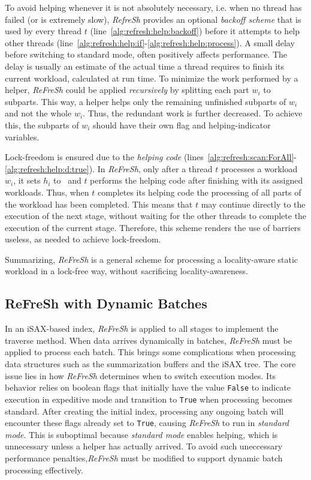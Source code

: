 To avoid helping whenever it is not absolutely necessary, i.e. when no thread has
failed (or is extremely slow), \textit{RefreSh} provides an optional {\em backoff scheme} that is used
by every thread $t$ (line~\ref{alg:refresh:help:backoff}) 
before it attempts to help other threads (line~\ref{alg:refresh:help:if}-\ref{alg:refresh:help:process}).
A small delay before switching to standard mode, often positively affects performance.
The delay is usually an estimate of the actual time a thread requires to finish its
current workload, calculated at run time.
% 
To minimize the work performed by a helper, \textit{ReFreSh} could
be applied  {\em recursively} by splitting each part $w_i$ to subparts. 
This way, a helper helps only the remaining unfinished subparts of $w_i$
and not the whole $w_i$. Thus, the redundant work is further decreased. 
To achieve this, the subparts of $w_i$ should have their own flag and helping-indicator variables.

Lock-freedom is ensured due to the {\em helping code} (lines~\ref{alg:refresh:scan:ForAll}-
\ref{alg:refresh:help:d:true}). In \textit{ReFreSh}, only after a thread
$t$ processes a workload $w_i$, it sets $h_i$ to \True\, and $t$ performs 
the helping code after finishing with its assigned workloads. Thus, when $t$ completes
its helping code the processing of all parts of the workload has been completed. 
This means that $t$ may continue directly to the execution of the next stage, without
waiting for the other threads to complete the execution of the current stage. 
Therefore, this scheme renders the use of barriers useless, as needed to achieve lock-freedom. 

Summarizing, \textit{ReFreSh} is a general scheme for processing a locality-aware
static workload in a lock-free way, without sacrificing locality-awareness. 


\subsection{\textbf{ReFreSh with Dynamic Batches}}  

In an iSAX-based index, \textit{ReFreSh} is applied to all stages to implement the traverse
method. When data arrives dynamically in batches, \textit{ReFreSh} must be applied to process
each batch. This brings some complications when processing data structures such as the summarization
buffers and the iSAX tree.
% 
The core issue lies in how \textit{ReFreSh} determines when to switch execution modes.
Its behavior relies on boolean flags that initially have the value \texttt{False} to 
indicate execution in expeditive mode and transition
to \texttt{True} when processing becomes standard. After creating the initial index, processing any
ongoing batch will encounter these flags already set to \texttt{True}, causing \textit{ReFreSh} to 
run in \textit{standard mode}. This is suboptimal because \textit{standard mode} enables helping,
which is unnecessary unless a helper has actually arrived. To avoid such uneccessary performance
penalties,\textit{ReFreSh} must be modified to support dynamic batch processing effectively.  

